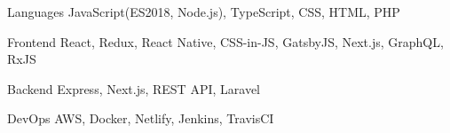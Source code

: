 

\begin{cvskills}

  \cvskill
    {Languages} %
    {JavaScript(ES2018, Node.js), TypeScript, CSS, HTML, PHP} %

  \cvskill
    {Frontend} %
    {React, Redux, React Native, CSS-in-JS, GatsbyJS, Next.js, GraphQL, RxJS} %

  \cvskill
    {Backend} %
    {Express, Next.js, REST API, Laravel} %

  \cvskill
  {DevOps} %
  {AWS, Docker, Netlify, Jenkins, TravisCI} %

\end{cvskills}
